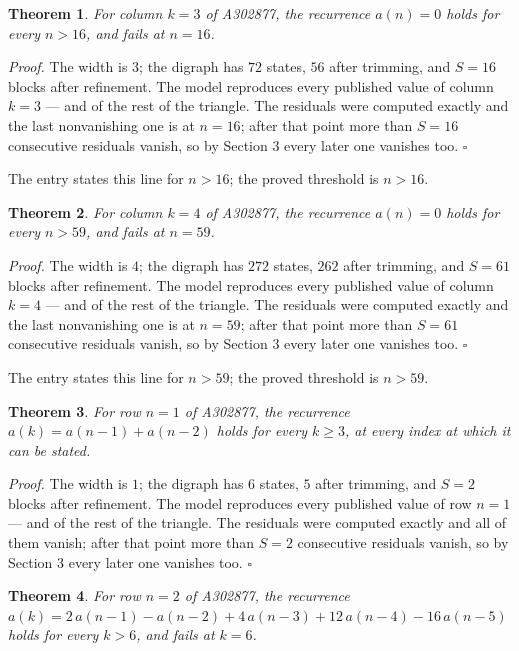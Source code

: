 \documentclass[11pt]{article}
\newtheorem{theorem}{Theorem}
\theoremstyle{definition}
\begin{document}
\begin{theorem} For column $k = 3$ of A302877, the recurrence $a(n) = 0$ holds for every $n > 16$, and fails at $n = 16$.\end{theorem}

{\itshape Proof.} The width is $3$; the digraph has $72$ states, $56$ after trimming, and $S = 16$ blocks after refinement. The model reproduces every published value of column $k = 3$ --- and of the rest of the triangle. The residuals were computed exactly and the last nonvanishing one is at $n = 16$; after that point more than $S = 16$ consecutive residuals vanish, so by Section 3 every later one vanishes too. $\square$

The entry states this line for $n > 16$; the proved threshold is $n > 16$.

\begin{theorem} For column $k = 4$ of A302877, the recurrence $a(n) = 0$ holds for every $n > 59$, and fails at $n = 59$.\end{theorem}

{\itshape Proof.} The width is $4$; the digraph has $272$ states, $262$ after trimming, and $S = 61$ blocks after refinement. The model reproduces every published value of column $k = 4$ --- and of the rest of the triangle. The residuals were computed exactly and the last nonvanishing one is at $n = 59$; after that point more than $S = 61$ consecutive residuals vanish, so by Section 3 every later one vanishes too. $\square$

The entry states this line for $n > 59$; the proved threshold is $n > 59$.

\begin{theorem} For row $n = 1$ of A302877, the recurrence $a(k) = a(n-1) + a(n-2)$ holds for every $k \ge 3$, at every index at which it can be stated.\end{theorem}

{\itshape Proof.} The width is $1$; the digraph has $6$ states, $5$ after trimming, and $S = 2$ blocks after refinement. The model reproduces every published value of row $n = 1$ --- and of the rest of the triangle. The residuals were computed exactly and all of them vanish; after that point more than $S = 2$ consecutive residuals vanish, so by Section 3 every later one vanishes too. $\square$

\begin{theorem} For row $n = 2$ of A302877, the recurrence $a(k) = 2\,a(n-1) - a(n-2) + 4\,a(n-3) + 12\,a(n-4) - 16\,a(n-5)$ holds for every $k > 6$, and fails at $k = 6$.\end{theorem}
\end{document}

